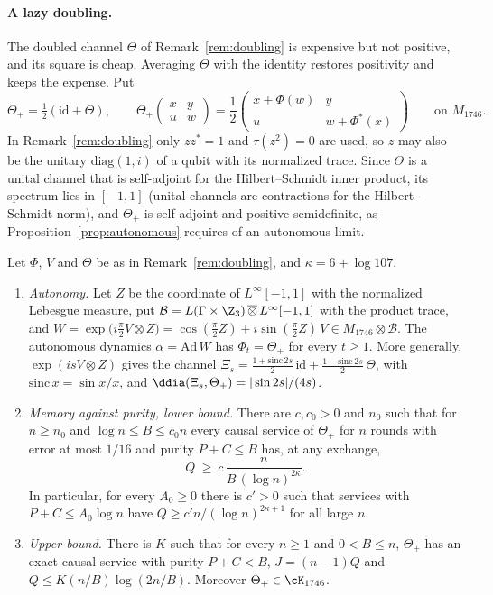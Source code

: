 \paragraph{A lazy doubling.} The doubled channel $\Theta$ of Remark~\ref{rem:doubling} is expensive but not positive, and its square is cheap.
Averaging $\Theta$ with the identity restores positivity and keeps the expense. Put
\[
\Theta_+=\tfrac12(\mathrm{id}+\Theta),\qquad
\Theta_+\begin{pmatrix}x&y\\u&w\end{pmatrix}=\frac12\begin{pmatrix}x+\Phi(w)&y\\u&w+\Phi^*(x)\end{pmatrix}\qquad\text{on }M_{1746}.
\]
In Remark~\ref{rem:doubling} only $zz^*=1$ and $\tau(z^2)=0$ are used, so $z$ may also be the unitary $\mathrm{diag}(1,i)$ of a qubit with its
normalized trace. Since $\Theta$ is a unital channel that is self-adjoint for the Hilbert--Schmidt inner product, its spectrum lies in $[-1,1]$ (unital channels are contractions for the Hilbert--Schmidt norm), and
$\Theta_+$ is self-adjoint and positive semidefinite, as Proposition~\ref{prop:autonomous} requires of an autonomous limit.

\begin{proposition}\label{prop:lazy}
Let $\Phi$, $V$ and $\Theta$ be as in Remark~\ref{rem:doubling}, and $\kappa=6+\log107$.
\begin{enumerate}[label=(\alph*),itemsep=1pt]
\item \emph{Autonomy.} Let $Z$ be the coordinate of $L^\infty[-1,1]$ with the normalized Lebesgue measure, put
$\mathcal B=L(\Gamma\times\Z_3)\,\overline\otimes\,L^\infty[-1,1]$ with the product trace, and
$W=\exp\bigl(i\tfrac\pi2V\otimes Z\bigr)=\cos(\tfrac\pi2Z)+i\sin(\tfrac\pi2Z)\,V\in M_{1746}\otimes\mathcal B$. The autonomous dynamics
$\alpha=\mathrm{Ad}\,W$ has $\Phi_t=\Theta_+$ for every $t\ge1$. More generally, $\exp(isV\otimes Z)$ gives the channel
$\Xi_s=\frac{1+\mathrm{sinc}\,2s}2\,\mathrm{id}+\frac{1-\mathrm{sinc}\,2s}2\,\Theta$, with $\mathrm{sinc}\,x=\sin x/x$, and
$\ddia(\Xi_s,\Theta_+)=|\sin2s|/(4s)$.
\item \emph{Memory against purity, lower bound.} There are $c,c_0>0$ and $n_0$ such that for $n\ge n_0$ and $\log n\le B\le c_0n$ every causal
service of $\Theta_+$ for $n$ rounds with error at most $1/16$ and purity $P+C\le B$ has, at any exchange,
\[
Q\ \ge\ c\,\frac n{B\,(\log n)^{2\kappa}} .
\]
In particular, for every $A_0\ge0$ there is $c'>0$ such that services with $P+C\le A_0\log n$ have $Q\ge c'n/(\log n)^{2\kappa+1}$ for all large $n$.
\item \emph{Upper bound.} There is $K$ such that for every $n\ge1$ and $0<B\le n$, $\Theta_+$ has an exact causal service with purity $P+C<B$,
$J=(n-1)Q$ and $Q\le K(n/B)\log(2n/B)$. Moreover $\Theta_+\in\cK_{1746}$.
\end{enumerate}
\end{proposition}

